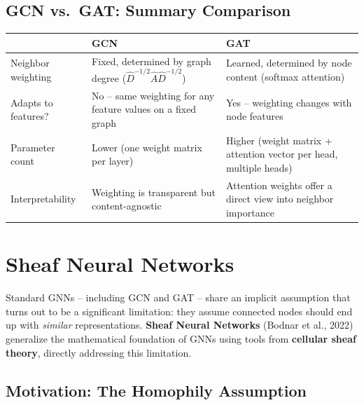 \documentclass[12pt,a4paper]{article}
\begin{document}
\subsection{GCN vs.\ GAT: Summary Comparison}

\begin{center}
\renewcommand{\arraystretch}{1.3}
\begin{tabular}{|l|p{4.2cm}|p{4.2cm}|}
\hline
& \textbf{GCN} & \textbf{GAT} \\
\hline
Neighbor weighting & Fixed, determined by graph degree ($\hat D^{-1/2}\hat A \hat D^{-1/2}$) & Learned, determined by node content (softmax attention) \\
Adapts to features? & No -- same weighting for any feature values on a fixed graph & Yes -- weighting changes with node features \\
Parameter count & Lower (one weight matrix per layer) & Higher (weight matrix + attention vector per head, multiple heads) \\
Interpretability & Weighting is transparent but content-agnostic & Attention weights offer a direct view into neighbor importance \\
\hline
\end{tabular}
\end{center}

\newpage

\section{Sheaf Neural Networks}

Standard GNNs -- including GCN and GAT -- share an implicit assumption that turns out to be a significant limitation: they assume connected nodes should end up with \emph{similar} representations. \textbf{Sheaf Neural Networks} (Bodnar et al., 2022) generalize the mathematical foundation of GNNs using tools from \textbf{cellular sheaf theory}, directly addressing this limitation.

\subsection{Motivation: The Homophily Assumption}
\end{document}
